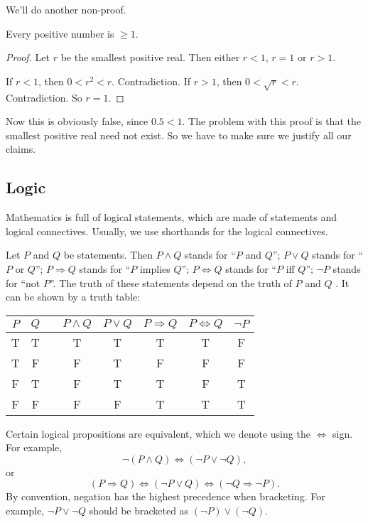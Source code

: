 \documentclass[a4paper]{article}
\begin{document}
We'll do another non-proof.
\begin{prop}
  Every positive number is $\geq 1$.
\end{prop}

\begin{proof}
  Let $r$ be the smallest positive real. Then either $r < 1$, $r = 1$ or $r > 1$.

  If $r < 1$, then $0 < r^2 < r$. Contradiction. If $r > 1$, then $0 < \sqrt{r} < r$. Contradiction. So $r = 1$.
\end{proof}
Now this is obviously false, since $0.5 < 1$. The problem with this proof is that the smallest positive real need not exist. So we have to make sure we justify all our claims.

\subsection{Logic}
Mathematics is full of logical statements, which are made of statements and logical connectives. Usually, we use shorthands for the logical connectives.

Let $P$ and $Q$ be statements. Then $P\wedge Q$ stands for ``$P$ and $Q$''; $P\vee Q$ stands for ``$P$ or $Q$''; $P\Rightarrow Q$ stands for ``$P$ implies $Q$''; $P\Leftrightarrow Q$ stands for ``$P$ iff $Q$''; $\neg P$ stands for ``not $P$''. The truth of these statements depend on the truth of $P$ and $Q$ . It can be shown by a truth table:
\begin{center}
  \begin{tabular}{cccccccc}
    \toprule
    $P$ & $Q$ &\quad &$P\wedge Q$ & $P\vee Q$ & $P\Rightarrow Q$ & $P\Leftrightarrow Q$ & $\neg P$ \\
    \midrule
    T & T & & T & T & T & T & F\\
    T & F & & F & T & F & F & F\\
    F & T & & F & T & T & F & T\\
    F & F & & F & F & T & T & T\\
    \bottomrule
  \end{tabular}
\end{center}
Certain logical propositions are equivalent, which we denote using the $\Leftrightarrow$ sign. For example,
\[
  \neg(P\wedge Q) \Leftrightarrow (\neg P\vee \neg Q),
\]
or
\[
  (P\Rightarrow Q) \Leftrightarrow (\neg P\vee Q) \Leftrightarrow (\neg Q\Rightarrow \neg P).
\]
By convention, negation has the highest precedence when bracketing. For example, $\neg P\vee \neg Q$ should be bracketed as $(\neg P)\vee (\neg Q)$.
\end{document}
